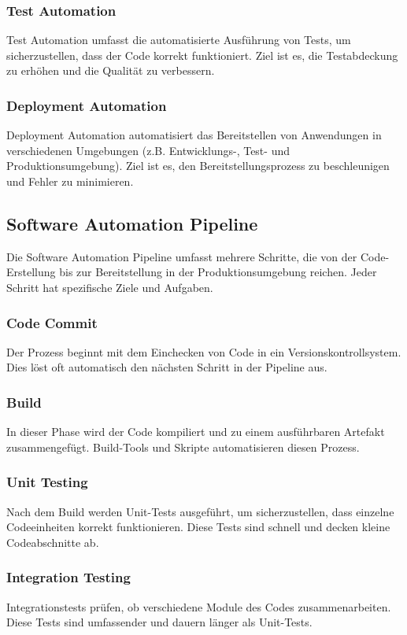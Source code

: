 \subsubsection{Test Automation}
Test Automation umfasst die automatisierte Ausführung von Tests, um sicherzustellen, dass der Code korrekt funktioniert. Ziel ist es, die Testabdeckung zu erhöhen und die Qualität zu verbessern.

\subsubsection{Deployment Automation}
Deployment Automation automatisiert das Bereitstellen von Anwendungen in verschiedenen Umgebungen (z.B. Entwicklungs-, Test- und Produktionsumgebung). Ziel ist es, den Bereitstellungsprozess zu beschleunigen und Fehler zu minimieren.

\subsection{Software Automation Pipeline}

Die Software Automation Pipeline umfasst mehrere Schritte, die von der Code-Erstellung bis zur Bereitstellung in der Produktionsumgebung reichen. Jeder Schritt hat spezifische Ziele und Aufgaben.

\subsubsection{Code Commit}
Der Prozess beginnt mit dem Einchecken von Code in ein Versionskontrollsystem. Dies löst oft automatisch den nächsten Schritt in der Pipeline aus.

\subsubsection{Build}
In dieser Phase wird der Code kompiliert und zu einem ausführbaren Artefakt zusammengefügt. Build-Tools und Skripte automatisieren diesen Prozess.

\subsubsection{Unit Testing}
Nach dem Build werden Unit-Tests ausgeführt, um sicherzustellen, dass einzelne Codeeinheiten korrekt funktionieren. Diese Tests sind schnell und decken kleine Codeabschnitte ab.

\subsubsection{Integration Testing}
Integrationstests prüfen, ob verschiedene Module des Codes zusammenarbeiten. Diese Tests sind umfassender und dauern länger als Unit-Tests.


